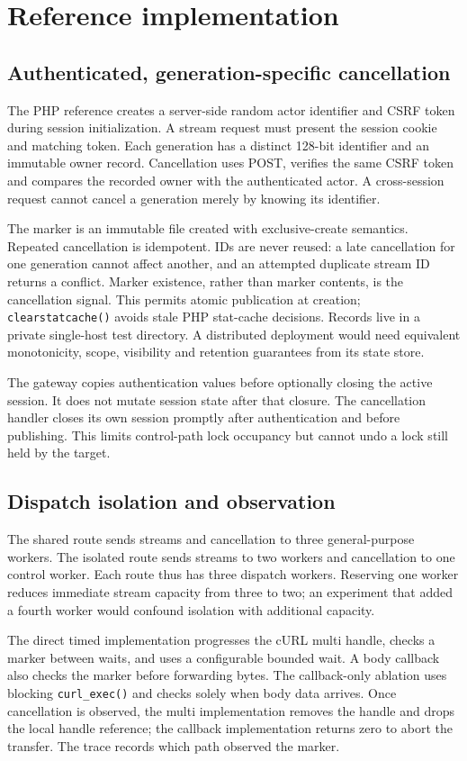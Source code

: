 \documentclass[11pt,a4paper]{article}
\begin{document}
\section{Reference implementation}
\subsection{Authenticated, generation-specific cancellation}
The PHP reference creates a server-side random actor identifier and CSRF token during session initialization. A stream request must present the session cookie and matching token. Each generation has a distinct 128-bit identifier and an immutable owner record. Cancellation uses POST, verifies the same CSRF token and compares the recorded owner with the authenticated actor. A cross-session request cannot cancel a generation merely by knowing its identifier.

The marker is an immutable file created with exclusive-create semantics. Repeated cancellation is idempotent. IDs are never reused: a late cancellation for one generation cannot affect another, and an attempted duplicate stream ID returns a conflict. Marker existence, rather than marker contents, is the cancellation signal. This permits atomic publication at creation; \texttt{clearstatcache()} avoids stale PHP stat-cache decisions. Records live in a private single-host test directory. A distributed deployment would need equivalent monotonicity, scope, visibility and retention guarantees from its state store.

The gateway copies authentication values before optionally closing the active session. It does not mutate session state after that closure. The cancellation handler closes its own session promptly after authentication and before publishing. This limits control-path lock occupancy but cannot undo a lock still held by the target.

\subsection{Dispatch isolation and observation}
The shared route sends streams and cancellation to three general-purpose workers. The isolated route sends streams to two workers and cancellation to one control worker. Each route thus has three dispatch workers. Reserving one worker reduces immediate stream capacity from three to two; an experiment that added a fourth worker would confound isolation with additional capacity.

The direct timed implementation progresses the cURL multi handle, checks a marker between waits, and uses a configurable bounded wait. A body callback also checks the marker before forwarding bytes. The callback-only ablation uses blocking \texttt{curl\_exec()} and checks solely when body data arrives. Once cancellation is observed, the multi implementation removes the handle and drops the local handle reference; the callback implementation returns zero to abort the transfer. The trace records which path observed the marker.
\end{document}
